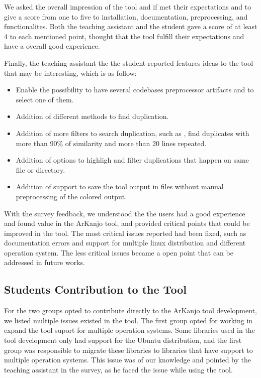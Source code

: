 We asked the overall impression of the tool and if met their expectations and to give a score from one 
to five to installation, documentation, preprocessing, and functionalites. 
Both the teaching assistant and the student gave a score of at least 4 to each mentioned point,
thought that the tool fulfill their expectations and have a overall good experience.

Finally, the teaching assistant the the student reported features ideas to the tool that may be interesting, which 
is as follow:

\begin{itemize}

\item Enable the possibility to have several codebases preprocessor artifacts and to select one of them.

\item Addition of different methods to find duplication.

\item Addition of more filters to search duplication, such as , find duplicates with
more than 90\% of similarity and more than 20 lines repeated.

\item Addition of options to highligh and filter duplications that happen on same file or directory.

\item Addition of support to save the tool output in files without manual preprocessing of the colored output.

\end{itemize}

With the survey feedback, we understood the the users had a good experience and found value in the ArKanjo tool,
and provided critical points that could be improved in the tool. The most critical issues reported had been fixed,
such as documentation errors and support for multiple linux distribution and different operation system. 
The less critical issues became a open point that can be addressed in future works.

\subsection{Students Contribution to the Tool}

For the two groups opted to contribute directly to the ArKanjo tool development, 
we listed multiple issues existed in the tool. The first group opted for working 
in expand the tool suport for multiple operation systems. Some libraries used in the 
tool development only had support for the Ubuntu distribution, and the first group was 
responsible to migrate these libraries to libraries that have support to multiple operation
systems. This issue was of our knowledge and pointed by the teaching assistant in the survey, as 
he faced the issue while using the tool.

